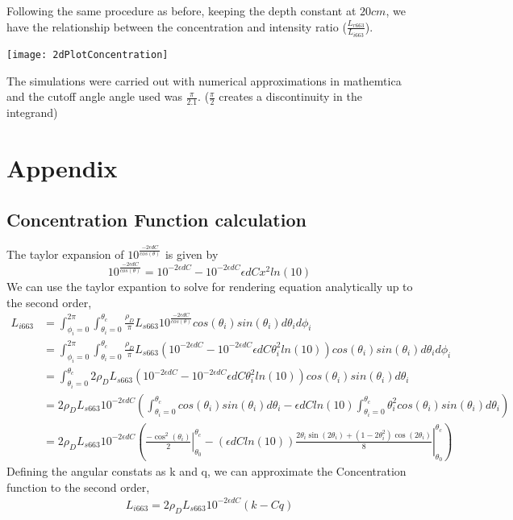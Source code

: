 \documentclass{article}
\begin{document}
Following the same procedure as before, keeping the depth constant at $ 20 cm$, we have the relationship between the
concentration and intensity ratio ($ \frac{L_{r663}}{L_{i663}}$).
\begin{center}
  \texttt{[image: 2dPlotConcentration]}
\end{center}

The simulations were carried out with numerical approximations in mathemtica and the cutoff angle angle used was $ \frac{\pi}{2.1}$.
($\frac{\pi}{2}$ creates a discontinuity in the integrand)
\section{Appendix}
\subsection{Concentration Function calculation}
The taylor expansion of $ 10^{\frac{-2\epsilon d C}{cos(\theta)}}$ is given by
$$ 10^{\frac{-2\epsilon d C}{ cos(\theta)}} = 10^{-2\epsilon d C} - 10^{-2\epsilon d C}\epsilon d C x^2ln(10)$$
We can use the taylor expantion to solve for rendering equation analytically up to the second order,
\begin{align*}
  L_{i 663} &= \int^{2\pi}_{\phi_i = 0}\int^{\theta_c}_{\theta_i = 0}
  \frac{\rho_D}{\pi}  L_{s 663} 10^\frac{-2\epsilon d C}{cos(\theta)}cos(\theta_i)sin(\theta_i)d\theta_i d\phi_i
      \\    &=  \int^{2\pi}_{\phi_i = 0}\int^{\theta_c}_{\theta_i = 0}
      \frac{\rho_D}{\pi}  L_{s 663}\left(10^{-2\epsilon d C} - 10^{-2\epsilon d C}\epsilon d C \theta_i^2ln(10)\right)
      cos(\theta_i)sin(\theta_i)d\theta_i d\phi_i
      \\    &= \int^{\theta_c}_{\theta_i = 0}
      2\rho_D  L_{s 663}\left(10^{-2\epsilon d C} - 10^{-2\epsilon d C}\epsilon d C \theta_i^2ln(10)\right)
      cos(\theta_i)sin(\theta_i)d\theta_i
      \\ &= 2\rho_D  L_{s 663}10^{-2\epsilon d C} \left(
      \int^{\theta_c}_{\theta_i = 0}cos(\theta_i)sin(\theta_i)d\theta_i-\epsilon d C ln(10)\int^{\theta_c}_{\theta_i = 0} \theta_i^2 cos(\theta_i)sin(\theta_i)d\theta_i
      \right)
      \\&= 2\rho_D  L_{s 663}10^{-2\epsilon d C} \left(\left. \frac{-\cos^2(\theta_i)}{2}\right \rvert^{\theta_c}_{\theta_0} - \left.
      \left(\epsilon d C ln(10)\right)\frac{2\theta_i\sin\left(2\theta_i\right)+\left(1-2\theta_i^2\right)\cos\left(2\theta_i\right)}{8} \right \rvert^{\theta_c}_{\theta_0}
      \right)
\end{align*}
Defining the angular constats as k and q, we can approximate the Concentration function to the second order,
\begin{align*}
L_{i 663} = 2\rho_D  L_{s 663}10^{-2\epsilon d C} (k - Cq)
\end{align*}
\end{document}
